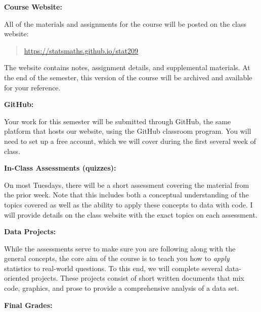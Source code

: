 \documentclass[12pt]{article}
\begin{document}
\bigskip

\textbf{Course Website:} \vspace{6pt}

All of the materials and assignments for the course will be posted
on the class website:
\begin{quote}
\url{https://statsmaths.github.io/stat209}
\end{quote}
The website contains notes, assignment details, and
supplemental materials. At the end of the semester, this version of
the course will be archived and available for your reference.

\vspace{0.4cm}

\textbf{GitHub:} \vspace{6pt}

Your work for this semester will be submitted through GitHub,
the same platform that hosts our website, using the GitHub
classroom program. You will need to set up a free account, which
we will cover during the first several week of class.

\newpage

\textbf{In-Class Assessments (quizzes):} \vspace{6pt}

On most Tuesdays, there will be a short assessment covering
the material from the prior week. Note that this includes both
a conceptual understanding of the topics covered as well as the
ability to apply these concepts to data with code. I will provide
details on the class website with the exact topics on each assessment.

\bigskip

\textbf{Data Projects:} \vspace{6pt}

While the assessments serve to make sure you are following along
with the general concepts, the core aim of the course is to teach
you how to \textit{apply} statistics to real-world questions. To
this end, we will complete several data-oriented projects.
These projects consist of short written documents that mix code,
graphics, and prose to provide a comprehensive analysis of a data set.

\bigskip

\textbf{Final Grades:} \vspace{6pt}
\end{document}
